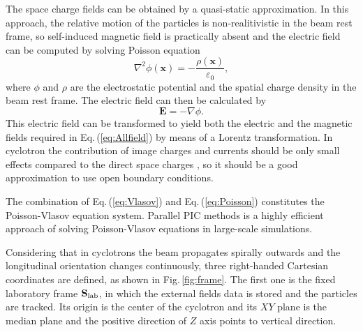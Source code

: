 \documentclass[aps,prstab,twocolumn,superscriptaddress]{revtex4}
\newcommand{\bs}[1]{\mathbf #1}
\begin{document}
The space charge fields can be obtained
by a quasi-static approximation. In this approach, the relative motion of the particles is non-realitivistic in the beam rest frame, so self-induced magnetic field is practically absent and the electric field can be computed by solving Poisson equation
\begin{equation}\label{eq:Poisson}
  \nabla^{2} \phi(\bs{x}) = - \frac{\rho(\bs{x})}{\varepsilon_0},
\end{equation}
where $\phi$ and $\rho$ are the electrostatic potential and the spatial charge density in the beam rest frame. The electric field can then be calculated by
\begin{equation}\label{eq:Efield}
  \bs{E}=-\nabla\phi.
\end{equation}
This electric field can be transformed to yield both the electric and the magnetic fields required in Eq.\,(\ref{eq:Allfield}) by means of a Lorentz transformation.
In cyclotron the contribution of image charges and currents should be only small effects compared to the direct space charges \cite{Baartman:1}, so it should be a good approximation to use 
open boundary conditions. 

The combination of Eq.\,(\ref{eq:Vlasov}) and Eq.\,(\ref{eq:Poisson}) constitutes the Poisson-Vlasov equation system. 
Parallel PIC methods is a highly efficient approach of solving Poisson-Vlasov equations in large-scale simulations. 

Considering that in cyclotrons the beam propagates spirally outwards and the longitudinal orientation changes continuously,
three right-handed Cartesian coordinates are defined, as shown in Fig.\,\ref{fig:frame}.  
The first one is the fixed laboratory frame ${\bs{S}_{\RM{lab}}}$, in which the external fields data is stored and the particles are tracked. 
Its origin is the center of the cyclotron and its $XY$ plane is the median plane and the positive direction of $Z$ axis points to vertical direction.
\end{document}
